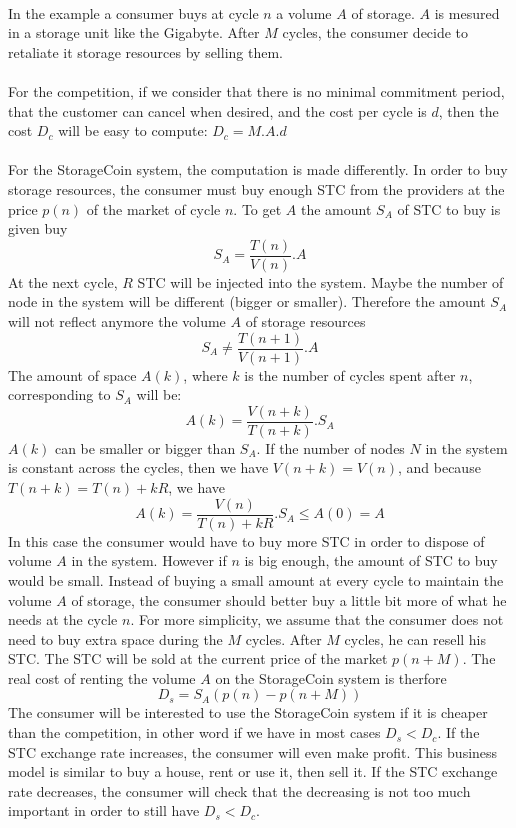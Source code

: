 \documentclass[a4paper,12pt]{article}
\begin{document}
\paragraph*{}
In the example a consumer buys at cycle $n$ a volume $A$ of storage. $A$ is mesured in a storage unit like the Gigabyte. After $M$ cycles, the consumer decide to retaliate it storage resources by selling them.

\paragraph*{}
For the competition, if we consider that there is no minimal commitment period, that the customer can cancel when desired, and the cost per cycle is $d$, then the cost $D_{c}$ will be easy to compute: $D_{c}=M.A.d$

\paragraph*{}
For the StorageCoin system, the computation is made differently. In order to buy storage resources, the consumer must buy enough STC from the providers at the price $p(n)$ of the market of cycle $n$.
To get $A$ the amount $S_{A}$ of STC to buy is given buy 
\[S_{A}=\frac{T(n)}{V(n)}.A\]
At the next cycle, $R$ STC will be injected into the system. Maybe the number of node in the system will be different (bigger or smaller). 
Therefore the amount $S_{A}$ will not reflect anymore the volume $A$ of storage resources 
\[S_{A}\neq \frac{T(n+1)}{V(n+1)}.A\]
The amount of space $A(k)$, where $k$ is the number of cycles spent after $n$, corresponding to $S_{A}$ will be: 
\[A(k)=\frac{V(n+k)}{T(n+k)}.S_{A}\]
$A(k)$ can be smaller or bigger than $S_{A}$. If the number of nodes $N$ in the system is constant across the cycles, then we have $V(n+k)=V(n)$, and because $T(n+k)=T(n)+kR$, we have
\[A(k)=\frac{V(n)}{T(n)+kR}.S_{A}\le A(0)=A\]
In this case the consumer would have to buy more STC in order to dispose of volume $A$ in the system.
However if $n$ is big enough, the amount of STC to buy would be small.
Instead of buying a small amount at every cycle to maintain the volume $A$ of storage, the consumer should better buy a little bit more of what he needs at the cycle $n$.
For more simplicity, we assume that the consumer does not need to buy extra space during the $M$ cycles.
After $M$ cycles, he can resell his STC. The STC will be sold at the current price of the market $p(n + M)$.
The real cost of renting the volume $A$ on the StorageCoin system is therfore
\[D_{s}=S_{A}(p(n)-p(n+M))\]
The consumer will be interested to use the StorageCoin system if it is cheaper than the competition, in other word if we have in most cases $D_{s}<D_{c}$.
If the STC exchange rate increases, the consumer will even make profit. 
This business model is similar to buy a house, rent or use it, then sell it.
If the STC exchange rate decreases, the consumer will check that the decreasing is not too much important in order to still have $D_{s}<D_{c}$. 


\end{document}
